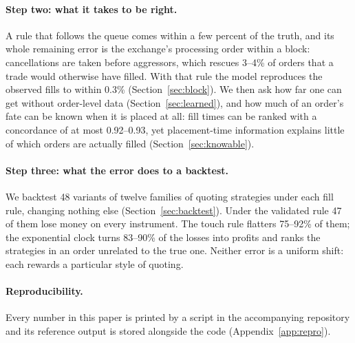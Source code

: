 \paragraph{Step two: what it takes to be right.}
A rule that follows the queue comes within a few percent of the truth, and its
whole remaining error is the exchange's processing order within a block:
cancellations are taken before aggressors, which rescues 3--4\% of orders that a
trade would otherwise have filled. With that rule the model reproduces the
observed fills to within 0.3\% (Section~\ref{sec:block}). We then ask how far one
can get without order-level data (Section~\ref{sec:learned}), and how much of an
order's fate can be known when it is placed at all: fill times can be ranked
with a concordance of at most 0.92--0.93, yet placement-time information explains
little of which orders are actually filled (Section~\ref{sec:knowable}).

\paragraph{Step three: what the error does to a backtest.}
We backtest 48 variants of twelve families of quoting strategies under each fill
rule, changing nothing else (Section~\ref{sec:backtest}). Under the validated
rule 47 of them lose money on every instrument. The touch rule flatters 75--92\%
of them; the exponential clock turns 83--90\% of the losses into profits and
ranks the strategies in an order unrelated to the true one. Neither error is a
uniform shift: each rewards a particular style of quoting.

\paragraph{Reproducibility.}
Every number in this paper is printed by a script in the accompanying
repository and its reference output is stored alongside the code
(Appendix~\ref{app:repro}).
